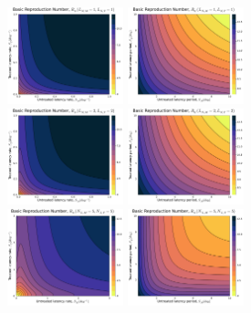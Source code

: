 \documentclass[12pt]{article}
\begin{document}
\begin{figure}[H]
    \centering
    \includegraphics[width=0.3\textwidth]{../../fig/gen_model/R0_rates_SMxST_1x1.pdf}
    \includegraphics[width=0.3\textwidth]{../../fig/gen_model/R0_periods_SMxST_1x1.pdf}\\
    \includegraphics[width=0.3\textwidth]{../../fig/gen_model/R0_rates_SMxST_2x2.pdf}
    \includegraphics[width=0.3\textwidth]{../../fig/gen_model/R0_periods_SMxST_2x2.pdf}\\
    \includegraphics[width=0.3\textwidth]{../../fig/gen_model/R0_rates_SMxST_5x5.pdf}
    \includegraphics[width=0.3\textwidth]{../../fig/gen_model/R0_periods_SMxST_5x5.pdf}\\

\end{figure}
\end{document}
